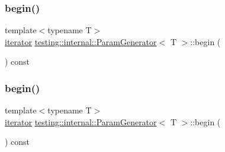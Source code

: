 \subsubsection{\texorpdfstring{begin()}{begin()}\hspace{0.1cm}{\footnotesize\ttfamily [2/3]}}
{\footnotesize\ttfamily template$<$typename T$>$ \\
\mbox{\hyperlink{classtesting_1_1internal_1_1_param_generator_a448b08a8eaae1f1d27840d4dbd66c357}{iterator}} \mbox{\hyperlink{classtesting_1_1internal_1_1_param_generator}{testing\+::internal\+::\+Param\+Generator}}$<$ T $>$\+::begin (\begin{DoxyParamCaption}{ }\end{DoxyParamCaption}) const\hspace{0.3cm}{\ttfamily [inline]}}

\mbox{\label{classtesting_1_1internal_1_1_param_generator_a14e735c8bd113556ae905a560cd2d607}} 
\subsubsection{\texorpdfstring{begin()}{begin()}\hspace{0.1cm}{\footnotesize\ttfamily [3/3]}}
{\footnotesize\ttfamily template$<$typename T$>$ \\
\mbox{\hyperlink{classtesting_1_1internal_1_1_param_generator_a448b08a8eaae1f1d27840d4dbd66c357}{iterator}} \mbox{\hyperlink{classtesting_1_1internal_1_1_param_generator}{testing\+::internal\+::\+Param\+Generator}}$<$ T $>$\+::begin (\begin{DoxyParamCaption}{ }\end{DoxyParamCaption}) const\hspace{0.3cm}{\ttfamily [inline]}}

\mbox{\label{classtesting_1_1internal_1_1_param_generator_aaf8f75df1099a07ff771a550b48f9fbe}} 
